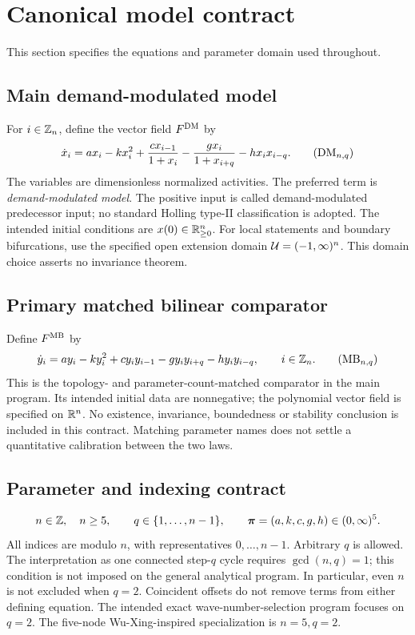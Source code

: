 \section{Canonical model contract}
\label{sec:canonical}
This section specifies the equations and parameter domain used throughout.

\subsection{Main demand-modulated model}
For $i\in\mathbb{Z}_n$, define the vector field $F^{\mathrm{DM}}$ by
\begin{equation}
\label{eq:canonical-dm}
\dot{x}_i=a x_i-kx_i^2+\frac{c x_{i-1}}{1+x_i}
             -\frac{g x_i}{1+x_{i+q}}-h x_i x_{i-q}.
\tag{$\DM_{n,q}$}
\end{equation}
The variables are dimensionless normalized activities. The preferred term is
\emph{demand-modulated model}. The positive input is called demand-modulated
predecessor input; no standard Holling type-II classification is adopted.
The intended initial conditions are $x(0)\in\mathbb{R}_{\geq 0}^{n}$. For local statements and
boundary bifurcations, use the specified open extension domain
$\mathcal{U}=(-1,\infty)^n$. This domain choice asserts no invariance theorem.

\subsection{Primary matched bilinear comparator}
Define $F^{\mathrm{MB}}$ by
\begin{equation}
\label{eq:canonical-mb}
\dot{y}_i=a y_i-k y_i^2+c y_i y_{i-1}
                 -g y_i y_{i+q}-h y_i y_{i-q},\qquad i\in\Zn.
\tag{$\MB_{n,q}$}
\end{equation}
This is the topology- and parameter-count-matched comparator in the main
program. Its intended initial data are nonnegative; the polynomial vector
field is specified on $\mathbb{R}^n$. No existence, invariance, boundedness or
stability conclusion is included in this contract. Matching parameter names
does not settle a quantitative calibration between the two laws.

\subsection{Parameter and indexing contract}
\[
n\in\mathbb{Z},\quad n\geq5,\qquad q\in\{1,\ldots,n-1\},\qquad
\boldsymbol{\pi}=(a,k,c,g,h)\in(0,\infty)^5.
\]
All indices are modulo $n$, with representatives $0,\ldots,n-1$.
Arbitrary $q$ is allowed. The interpretation as one connected step-$q$ cycle
requires $\gcd(n,q)=1$; this condition is not imposed on the general analytical
program. In particular, even $n$ is not excluded when $q=2$. Coincident offsets
do not remove terms from either defining equation.
The intended exact wave-number-selection program focuses on $q=2$.
The five-node Wu-Xing-inspired specialization is $n=5,q=2$.

